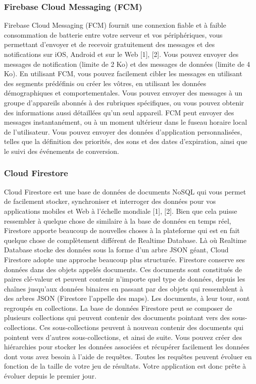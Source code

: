 \subsubsection{Firebase Cloud Messaging (FCM)}
Firebase Cloud Messaging (FCM) fournit une connexion fiable et à faible consommation de
batterie entre votre serveur et vos périphériques, vous permettant d'envoyer et de recevoir
gratuitement des messages et des notifications sur iOS, Android et sur le Web [1], [2]. Vous
pouvez envoyer des messages de notification (limite de 2 Ko) et des messages de données
(limite de 4 Ko).
En utilisant FCM, vous pouvez facilement cibler les messages en utilisant des segments
prédéfinis ou créer les vôtres, en utilisant les données démographiques et comportementales.
Vous pouvez envoyer des messages à un groupe d'appareils abonnés à des rubriques
spécifiques, ou vous pouvez obtenir des informations aussi détaillées qu'un seul appareil.
FCM peut envoyer des messages instantanément, ou à un moment ultérieur dans le fuseau
horaire local de l'utilisateur. Vous pouvez envoyer des données d'application personnalisées,
telles que la définition des priorités, des sons et des dates d'expiration, ainsi que le suivi des
événements de conversion.
\subsubsection{Cloud Firestore}
Cloud Firestore est une base de données de documents NoSQL qui vous permet de facilement
stocker, synchroniser et interroger des données pour vos applications mobiles et Web à l'échelle
mondiale [1], [2]. Bien que cela puisse ressembler à quelque chose de similaire à la base de
données en temps réel, Firestore apporte beaucoup de nouvelles choses à la plateforme qui est
en fait quelque chose de complètement différent de Realtime Database.
Là où Realtime Database stocke des données sous la forme d'un arbre JSON géant, Cloud
Firestore adopte une approche beaucoup plus structurée. Firestore conserve ses données dans des objets appelés documents. Ces documents sont constitués de paires clé-valeur et peuvent
contenir n'importe quel type de données, depuis les chaînes jusqu'aux données binaires en
passant par des objets qui ressemblent à des arbres JSON (Firestore l'appelle des maps). Les
documents, à leur tour, sont regroupés en collections.
La base de données Firestore peut se composer de plusieurs collections qui peuvent contenir
des documents pointant vers des sous-collections. Ces sous-collections peuvent à nouveau
contenir des documents qui pointent vers d'autres sous-collections, et ainsi de suite.
Vous pouvez créer des hiérarchies pour stocker les données associées et récupérer facilement
les données dont vous avez besoin à l'aide de requêtes. Toutes les requêtes peuvent évoluer en
fonction de la taille de votre jeu de résultats. Votre application est donc prête à évoluer depuis
le premier jour.
